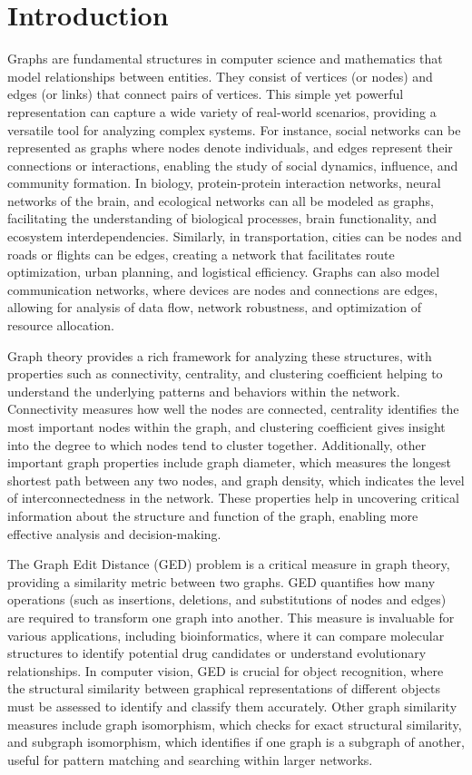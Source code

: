 \documentclass[../Thesis.tex]{subfiles}
\begin{document}
	\section{Introduction}
	\label{sec:introduction}
	
	Graphs are fundamental structures in computer science and mathematics that model relationships between entities. They consist of vertices (or nodes) and edges (or links) that connect pairs of vertices. This simple yet powerful representation can capture a wide variety of real-world scenarios, providing a versatile tool for analyzing complex systems. For instance, social networks can be represented as graphs where nodes denote individuals, and edges represent their connections or interactions, enabling the study of social dynamics, influence, and community formation. In biology, protein-protein interaction networks, neural networks of the brain, and ecological networks can all be modeled as graphs, facilitating the understanding of biological processes, brain functionality, and ecosystem interdependencies. Similarly, in transportation, cities can be nodes and roads or flights can be edges, creating a network that facilitates route optimization, urban planning, and logistical efficiency. Graphs can also model communication networks, where devices are nodes and connections are edges, allowing for analysis of data flow, network robustness, and optimization of resource allocation.
	
	Graph theory provides a rich framework for analyzing these structures, with properties such as connectivity, centrality, and clustering coefficient helping to understand the underlying patterns and behaviors within the network. Connectivity measures how well the nodes are connected, centrality identifies the most important nodes within the graph, and clustering coefficient gives insight into the degree to which nodes tend to cluster together. Additionally, other important graph properties include graph diameter, which measures the longest shortest path between any two nodes, and graph density, which indicates the level of interconnectedness in the network. These properties help in uncovering critical information about the structure and function of the graph, enabling more effective analysis and decision-making.
	
	The Graph Edit Distance (GED) problem is a critical measure in graph theory, providing a similarity metric between two graphs. GED quantifies how many operations (such as insertions, deletions, and substitutions of nodes and edges) are required to transform one graph into another. This measure is invaluable for various applications, including bioinformatics, where it can compare molecular structures to identify potential drug candidates or understand evolutionary relationships. In computer vision, GED is crucial for object recognition, where the structural similarity between graphical representations of different objects must be assessed to identify and classify them accurately. Other graph similarity measures include graph isomorphism, which checks for exact structural similarity, and subgraph isomorphism, which identifies if one graph is a subgraph of another, useful for pattern matching and searching within larger networks.
	
\end{document}
